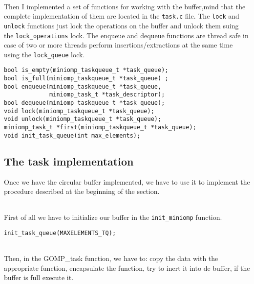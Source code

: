 \par ~\\
Then I implemented a set of functions for working with the buffer,mind that the complete implementation of them are located in the \texttt{task.c} file.
The \texttt{lock} and \texttt{unlock} functions just lock the operations on the buffer and unlock them suing the \texttt{lock\_operations} lock. The enqueue and dequeue functions are thread safe in case of two or more threads perform insertions/extractions at the same time using the \texttt{lock\_queue} lock.

\begin{lstlisting}[caption=Circular buffer functions, label=cbufferfunctions]
bool is_empty(miniomp_taskqueue_t *task_queue);
bool is_full(miniomp_taskqueue_t *task_queue) ;
bool enqueue(miniomp_taskqueue_t *task_queue, 
             miniomp_task_t *task_descriptor);
bool dequeue(miniomp_taskqueue_t *task_queue);
void lock(miniomp_taskqueue_t *task_queue);
void unlock(miniomp_taskqueue_t *task_queue);
miniomp_task_t *first(miniomp_taskqueue_t *task_queue);
void init_task_queue(int max_elements);
\end{lstlisting}

\subsection{The task implementation}
Once we have the circular buffer implemented, we have to use it to implement the procedure described at the beginning of the section.

\par ~\\
First of all we have to initialize our buffer in the \texttt{init\_miniomp} function.
\begin{lstlisting}[caption=Buffer initialisation, label=bufferinit]
    init_task_queue(MAXELEMENTS_TQ);
\end{lstlisting}

\par ~\\
Then, in the GOMP\_task function, we have to: copy the data with the appropriate function, encapsulate the function, try to inert it into de buffer, if the buffer is full execute it.

